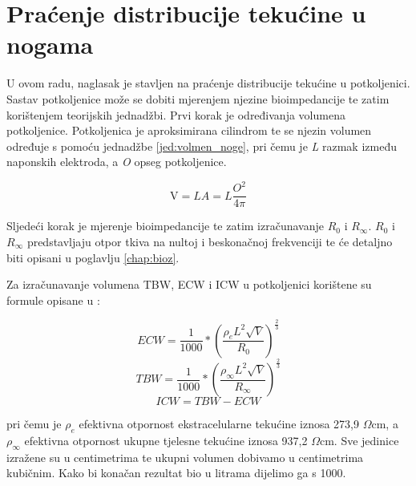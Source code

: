 \documentclass[../diplomski_rad.tex]{subfiles}
\begin{document}

\section{Praćenje distribucije tekućine u nogama}

U ovom radu, naglasak je stavljen na praćenje distribucije tekućine u potkoljenici. 
Sastav potkoljenice može se dobiti mjerenjem njezine bioimpedancije te zatim korištenjem teorijskih jednadžbi. 
Prvi korak je određivanja volumena potkoljenice. 
Potkoljenica je aproksimirana cilindrom te se njezin volumen određuje s pomoću jednadžbe \ref{jed:volmen_noge}, 
pri čemu je \textit{L} razmak između naponskih elektroda, a \textit{O} opseg potkoljenice.

\begin{equation}
    \label{jed:volmen_noge}
    \mathrm{V}=L A=L \frac{O^2}{4 \pi}
\end{equation} 

Sljedeći korak je mjerenje bioimpedancije te zatim izračunavanje $R_{0}$ i $R_{\infty}$.
$R_{0}$ i $R_{\infty}$ predstavljaju otpor tkiva na nultoj i beskonačnoj frekvenciji te će detaljno biti opisani u poglavlju \ref{chap:bioz}.

Za izračunavanje volumena TBW, ECW i ICW u potkoljenici korištene su formule opisane u \cite{Delano2022}:

\begin{equation}
    \label{jed:ecw_noge}
    ECW=\frac{1}{1000} *\left(\frac{\rho_e L^2 \sqrt{V}}{R_0}\right)^{\frac{2}{3}}
\end{equation} 
\begin{equation}
    \label{jed:tbw_noge}
    TBW=\frac{1}{1000} *\left(\frac{\rho_{\infty} L^2 \sqrt{V}}{R_{\infty}}\right)^{\frac{2}{3}}
\end{equation} 
\begin{equation}
    \label{jed:icw_noge}
    ICW=TBW-ECW 
\end{equation} 

pri čemu je $\rho_{e}$ efektivna otpornost ekstracelularne tekućine iznosa 273,9 $\Omega$cm, a 
$\rho_{\infty}$ efektivna otpornost ukupne tjelesne tekućine iznosa 937,2 $\Omega$cm.
Sve jedinice izražene su u centimetrima te ukupni volumen dobivamo u centimetrima kubičnim. 
Kako bi konačan rezultat bio u litrama dijelimo ga s 1000. 
\end{document}

